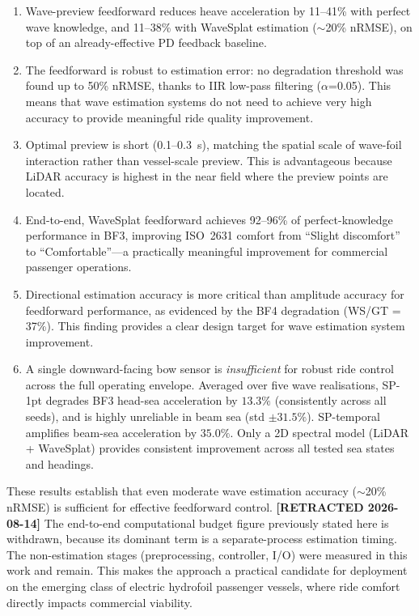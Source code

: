 \documentclass[review]{elsarticle}
\begin{document}
\begin{enumerate}
  \item Wave-preview feedforward reduces heave acceleration by
    11--41\% with perfect wave knowledge, and 11--38\% with
    WaveSplat estimation ($\sim$20\% nRMSE), on top of an already-effective
    PD feedback baseline.
  \item The feedforward is robust to estimation error: no degradation
    threshold was found up to 50\% nRMSE, thanks to IIR low-pass
    filtering ($\alpha$=0.05).  This means that wave estimation systems
    do not need to achieve very high accuracy to provide meaningful
    ride quality improvement.
  \item Optimal preview is short (0.1--0.3~s), matching the spatial
    scale of wave-foil interaction rather than vessel-scale preview.
    This is advantageous because LiDAR accuracy is highest in the
    near field where the preview points are located.
  \item End-to-end, WaveSplat feedforward achieves 92--96\% of
    perfect-knowledge performance in BF3, improving ISO~2631 comfort
    from ``Slight discomfort'' to ``Comfortable''---a practically
    meaningful improvement for commercial passenger operations.
  \item Directional estimation accuracy is more critical than amplitude
    accuracy for feedforward performance, as evidenced by the
    BF4 degradation (WS/GT = 37\%).  This finding provides a clear
    design target for wave estimation system improvement.
  \item A single downward-facing bow sensor is \emph{insufficient} for
    robust ride control across the full operating envelope.
    Averaged over five wave realisations, SP-1pt degrades BF3 head-sea
    acceleration by $13.3\%$ (consistently across all seeds), and is
    highly unreliable in beam sea (std $\pm 31.5\%$).  SP-temporal
    amplifies beam-sea acceleration by $35.0\%$.  Only a 2D spectral model
    (LiDAR + WaveSplat) provides consistent improvement across all tested
    sea states and headings.
\end{enumerate}

These results establish that even moderate wave estimation accuracy
($\sim$20\% nRMSE) is sufficient for effective feedforward control.
\textbf{[RETRACTED 2026-08-14]} The end-to-end computational budget figure
previously stated here is withdrawn, because its dominant term is a
separate-process estimation timing. The non-estimation stages
(preprocessing, controller, I/O) were measured in this work and remain.
This makes the approach a practical candidate for deployment on
the emerging class of electric hydrofoil passenger vessels, where
ride comfort directly impacts commercial viability.
\end{document}
